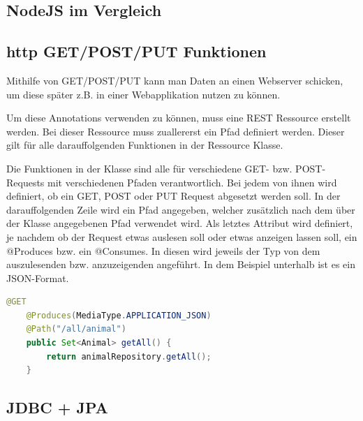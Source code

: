 \subsection{NodeJS im Vergleich}
\subsection{http GET/POST/PUT Funktionen}
Mithilfe von GET/POST/PUT kann man Daten an einen Webserver schicken, um diese später z.B. in einer Webapplikation nutzen zu können.
 
Um diese Annotations verwenden zu können, muss eine REST Ressource erstellt werden.
Bei dieser Ressource muss zuallererst ein Pfad definiert werden. Dieser gilt für alle darauffolgenden Funktionen in der Ressource Klasse.
 
Die Funktionen in der Klasse sind alle für verschiedene GET- bzw. POST-Requests mit verschiedenen Pfaden verantwortlich. Bei jedem von ihnen wird definiert, ob ein GET, POST oder PUT Request abgesetzt werden soll. In der darauffolgenden Zeile wird ein Pfad angegeben, welcher zusätzlich nach dem über der Klasse angegebenen Pfad verwendet wird. Als letztes Attribut wird definiert, je nachdem ob der Request etwas auslesen soll oder etwas anzeigen lassen soll, ein @Produces bzw. ein @Consumes. In diesen wird jeweils der Typ von dem auszulesenden bzw. anzuzeigenden angeführt. In dem Beispiel unterhalb ist es ein JSON-Format.
 
\begin{lstlisting}[language=java,caption=Quarkus POST-Request,label=lst:impl:canvasJSchartOptions]
    @GET
    @Produces(MediaType.APPLICATION_JSON)
    @Path("/all/animal")
    public Set<Animal> getAll() {
        return animalRepository.getAll();
    }
  \end{lstlisting}
 
\subsection{JDBC + JPA}
